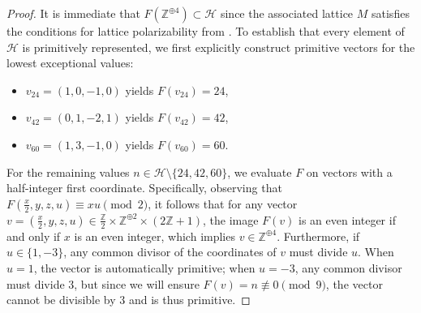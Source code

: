\documentclass[11pt,letterpaper]{amsart} %
\theoremstyle{definition}
\begin{document}
\begin{proof}
It is immediate that $F(\mathbb{Z}^{\oplus 4}) \subset \mathcal{H}$ since the associated lattice $M$ satisfies the conditions for lattice polarizability from \cite[Theorem 5.1]{YangYu}. %
To establish that every element of $\mathcal{H}$ is primitively represented, we first explicitly construct primitive vectors for the lowest exceptional values:
\begin{itemize}
    \item $v_{24} = (1,0,-1,0)$ yields $F(v_{24}) = 24$, %
    \item $v_{42} = (0,1,-2,1)$ yields $F(v_{42}) = 42$, %
    \item $v_{60} = (1,3,-1,0)$ yields $F(v_{60}) = 60$. %
\end{itemize}
For the remaining values $n \in \mathcal{H} \setminus \{24,42,60\}$, we evaluate $F$ on vectors with a half-integer first coordinate. %
Specifically, observing that $F\left(\frac{x}{2},y,z,u\right) \equiv xu \pmod 2$, %
it follows that for any vector $v = \left(\frac{x}{2},y,z,u\right) \in \frac{\mathbb{Z}}{2} \times \mathbb{Z}^{\oplus 2} \times (2\mathbb{Z}+1)$, the image $F(v)$ is an even integer if and only if $x$ is an even integer, which implies $v \in \mathbb{Z}^{\oplus 4}$. %
Furthermore, if $u \in \{1,-3\}$, any common divisor of the coordinates of $v$ must divide $u$. %
When $u=1$, the vector is automatically primitive; when $u=-3$, any common divisor must divide $3$, but since we will ensure $F(v) = n \not\equiv 0 \pmod 9$, the vector cannot be divisible by $3$ and is thus primitive. %


\end{proof}
\end{document}
